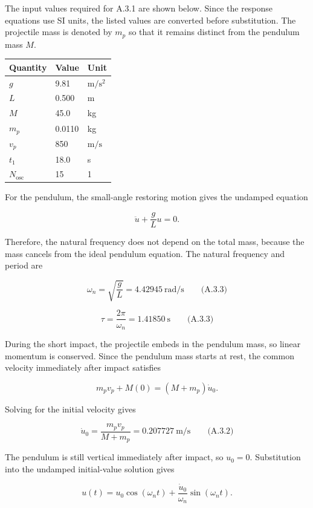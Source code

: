 The input values required for A.3.1 are shown below. Since the response equations use SI units, the listed values are converted before substitution. The projectile mass is denoted by \(m_p\) so that it remains distinct from the pendulum mass \(M\).

{ %
\begin{center}\small\begin{tabular}{@{}lll@{}}
\toprule\noalign{}
Quantity & Value & Unit \\
\midrule\noalign{}
\(g\) & 9.81 & \(\mathrm{m}/\mathrm{s}^{2}\) \\
\(L\) & 0.500 & m \\
\(M\) & 45.0 & kg \\
\(m_p\) & 0.0110 & kg \\
\(v_p\) & 850 & \(\mathrm{m}/\mathrm{s}\) \\
\(t_1\) & 18.0 & s \\
\(N_{\mathrm{osc}}\) & 15 & 1 \\
\bottomrule\end{tabular}\end{center}
}

For the pendulum, the small-angle restoring motion gives the undamped equation

\[\ddot{u}+\frac{g}{L}u=0.\]

Therefore, the natural frequency does not depend on the total mass, because the mass cancels from the ideal pendulum equation. The natural frequency and period are

\[\boxed{\omega_n=\sqrt{\frac{g}{L}}=4.42945\ \mathrm{rad}/\mathrm{s}}\qquad\text{(A.3.3)}\]

\[\boxed{\tau=\frac{2\pi}{\omega_n}=1.41850\ \mathrm{s}}\qquad\text{(A.3.3)}\]

During the short impact, the projectile embeds in the pendulum mass, so linear momentum is conserved. Since the pendulum mass starts at rest, the common velocity immediately after impact satisfies

\[m_pv_p+M(0)=(M+m_p)\dot{u}_0.\]

Solving for the initial velocity gives

\[\boxed{\dot{u}_0=\frac{m_pv_p}{M+m_p}=0.207727\ \mathrm{m}/\mathrm{s}}\qquad\text{(A.3.2)}\]

The pendulum is still vertical immediately after impact, so \(u_0=0\). Substitution into the undamped initial-value solution gives

\[u(t)=u_0\cos(\omega_nt)+\frac{\dot{u}_0}{\omega_n}\sin(\omega_nt).\]

